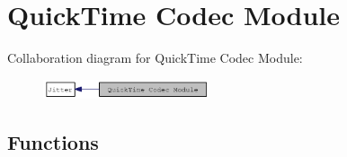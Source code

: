 \hypertarget{group__qtcodecmod}{
\section{QuickTime Codec Module}
\label{group__qtcodecmod}
}


Collaboration diagram for QuickTime Codec Module:\nopagebreak
\begin{figure}[H]
\begin{center}
\leavevmode
\includegraphics[width=139pt]{group__qtcodecmod}
\end{center}
\end{figure}
\subsection*{Functions}
